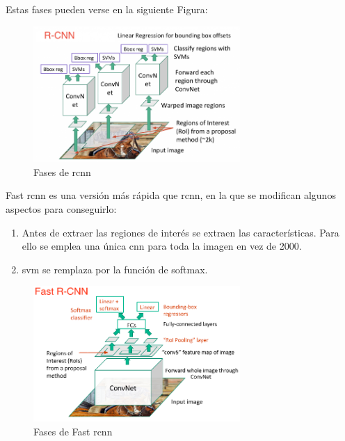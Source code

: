 Estas fases pueden verse en la siguiente Figura:

\begin{figure}[H]
  \begin{center}
    \includegraphics[width=0.7\textwidth]{figures/Estado_arte/rcnn.png}
		\caption{Fases de \acrshort{rcnn}}
		\label{fig.rcnn}
		\end{center}
\end{figure}

Fast \acrshort{rcnn} es una versión más rápida que \acrshort{rcnn}, en la que se modifican algunos aspectos para conseguirlo:
\begin{enumerate}
    \item Antes de extraer las regiones de interés se extraen las características. Para ello se emplea una única \acrshort{cnn} para toda la imagen en vez de 2000.
    \item \acrshort{svm} se remplaza por la función de softmax.
\end{enumerate}

\begin{figure}[H]
  \begin{center}
    \includegraphics[width=0.7\textwidth]{figures/Estado_arte/fast_rcnn.png}
		\caption{Fases de Fast \acrshort{rcnn}}
		\label{fig.fast_rcnn}
		\end{center}
\end{figure}

